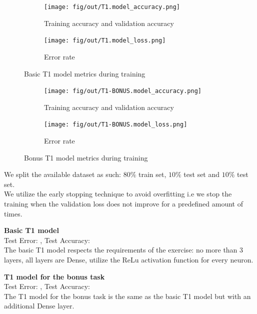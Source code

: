 \documentclass[tikz,14pt,fleqn]{article}
\begin{document}
\begin{figure}[h!]
\begin{subfigure}[t]{.49\linewidth}
  \centering
  \texttt{[image: fig/out/T1.model\_accuracy.png]}
  \caption{Training accuracy and validation accuracy}
  \label{fig:t1.accuracies}
\end{subfigure}
\begin{subfigure}[t]{.49\linewidth}
    \centering
    \texttt{[image: fig/out/T1.model\_loss.png]}
    \caption{Error rate}
    \label{fig:t1.losses}
\end{subfigure}
\caption{Basic T1 model metrics during training}
\label{fig:t1.metrics}
\end{figure}
\begin{figure}[h!]
\begin{subfigure}[t]{.49\linewidth}
  \centering
  \texttt{[image: fig/out/T1-BONUS.model\_accuracy.png]}
  \caption{Training accuracy and validation accuracy}
  \vspace{-0.5cm}
  \label{fig:t1-BONUS.accuracies}
\end{subfigure}
\begin{subfigure}[t]{.49\linewidth}
    \centering
    \texttt{[image: fig/out/T1-BONUS.model\_loss.png]}
    \caption{Error rate}
    \label{fig:t1-BONUS.losses}
\end{subfigure}
\caption{Bonus T1 model metrics during training}
\label{fig:t1-BONUS.metrics}
\end{figure}
We split the available dataset as such: $80\%$ train set, $10\%$ test set and $10\%$ test set.\\
We utilize the early stopping technique to avoid overfitting i.e we stop the training when the validation loss does not improve for a predefined amount of times.

\textbf{Basic T1 model}\\
Test Error: \textbf{}, Test Accuracy: \textbf{}\\
The basic T1 model respects the requirements of the exercise: no more than 3 layers, all layers are Dense, utilize the ReLu activation function for every neuron.

\textbf{T1 model for the bonus task}\\
Test Error: \textbf{}, Test Accuracy: \textbf{}\\
The T1 model for the bonus task is the same as the basic T1 model but with an additional Dense layer.
\end{document}
